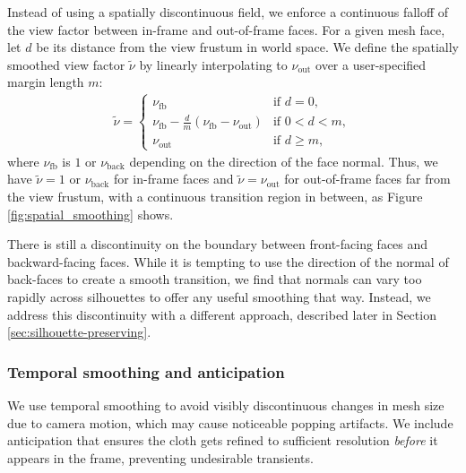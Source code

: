 \documentclass[10pt,journal,compsoc,twoside]{TexInputs/IEEEtran}
\begin{document}
Instead of using a spatially discontinuous field, we enforce a continuous falloff of
the view factor between in-frame and out-of-frame faces. For a given mesh face,
let $d$ be its distance from the view frustum in world space. We define the
spatially smoothed view factor $\tilde\nu$ by linearly interpolating to $\nu_{\text{out}}$ over a user-specified margin length $m$:
\begin{align}
  \tilde\nu = \begin{cases}
    \nu_{\text{fb}} & \text{if $d = 0$}, \\
    \nu_{\text{fb}} - \frac dm(\nu_{\text{fb}} - \nu_{\text{out}}) & \text{if $0 < d < m$}, \\
    \nu_{\text{out}} & \text{if $d \ge m$},
  \end{cases}
\end{align}
where $\nu_{\text{fb}}$ is $1$ or $\nu_{\text{back}}$ depending on the direction of the face normal.
Thus, we have $\tilde\nu = 1$ or $\nu_{\text{back}}$ for in-frame faces and $\tilde\nu =
\nu_{\text{out}}$ for out-of-frame faces far from the view frustum, with a continuous transition region in between, as Figure \ref{fig:spatial_smoothing} shows.

There is still a discontinuity on the boundary between front-facing faces
and backward-facing faces. While it is tempting to use the direction of the
normal of back-faces to create a smooth transition, we find that normals can vary too
rapidly across silhouettes to offer any useful smoothing that way. Instead, we
address this discontinuity with a different approach, described later in
Section \ref{sec:silhouette-preserving}.

\subsubsection{Temporal smoothing and anticipation} 

We use temporal smoothing to avoid visibly discontinuous changes in mesh size due to camera motion, which
may cause noticeable popping artifacts. We include anticipation that ensures the
cloth gets refined to sufficient resolution \emph{before} it appears in the
frame, preventing undesirable transients.

\end{document}
